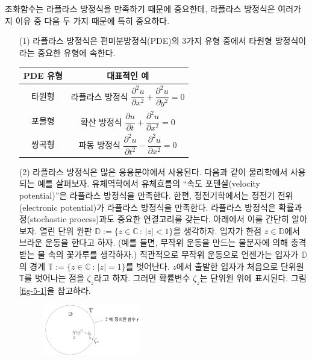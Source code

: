 조화함수는 라플라스 방정식을 만족하기 때문에 중요한데,
라플라스 방정식은 여러가지 이유 중 다음 두 가지 때문에 특히 중요하다.
\begin{itemize}
\item[(1)] 라플라스 방정식은 편미분방정식(PDE)의 3가지 유형 중에서 
타원형 방정식이라는 중요한 유형에 속한다.
\begin{center}
\renewcommand{\arraystretch}{1.5}  %
\begin{tabular}{ |c|c| } 
 \hline
PDE 유형 & 대표적인 예 \\ \hline \hline
타원형 & 라플라스 방정식 
$\dfrac{\partial^2 u}{\partial x^2} 
+ \dfrac{\partial^2 u}{\partial y^2} =0$ \\[1ex] \hline
포물형 & 확산 방정식 $\dfrac{\partial u}{\partial t} 
+ \dfrac{\partial^2 u}{\partial x^2} =0$ \\[1ex] \hline
쌍곡형 & 파동 방정식 $\dfrac{\partial^2 u}{\partial t^2} 
- \dfrac{\partial^2 u}{\partial x^2} =0$ \\[0.5ex]
\hline
\end{tabular}
\end{center}
\item[(2)] 라플라스 방정식은 많은 응용분야에서 사용된다.
다음과 같이 물리학에서 사용되는 예를 살펴보자.
유체역학에서 유체흐름의 ``속도 포텐셜(velocity potential)''은
라플라스 방정식을 만족한다. 한편, 정전기학에서는
정전기 전위(electronic potential)가 라플라스 방정식을 만족한다.
라플라스 방정식은 확률과정(stochastic process)과도 중요한 연결고리를 갖는다.
아래에서 이를 간단히 알아보자.
열린 단위 원판 $\mathbb D:= \{z\in \mathbb C\,:\, |z|<1\}$을 생각하자.
입자가 한점 $z\in\mathbb D$에서 브라운 운동을 한다고 하자.
(예를 들면, 무작위 운동을 만드는 물분자에 의해 충격받는 물 속의
꽃가루를 생각하자.)
직관적으로 무작위 운동으로 언젠가는 입자가 $\mathbb D$의 경계 
$\mathbb T:= \{ z\in \mathbb C \,:\, |z|=1 \}$를 벗어난다.
$z$에서 출발한 입자가 처음으로 단위원 $\mathbb T$를 벗어나는 
점을 $\zeta_z$라고 하자. 그러면 확률변수 $\zeta_z$는 단위원 위에 표시된다.
그림 \ref{fig-5-1}을 참고하라.
\begin{figure}[h!]
\begin{center}
\includegraphics[width=0.4\textwidth]{./SaltChapter/figs/fig-5-1-kr}

\end{center}
\end{figure}
\end{itemize}
